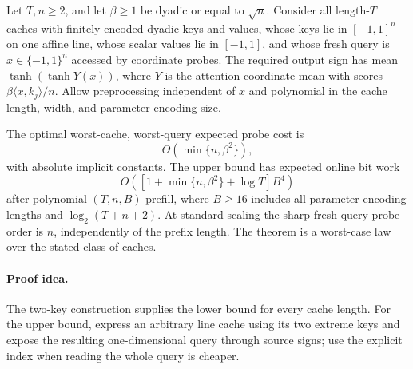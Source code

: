 \begin{theorem}
\label{thm:rankone-worstlaw}
Let $T,n\ge2$, and let $\beta\ge1$ be dyadic or equal to $\sqrt n$.
Consider all length-$T$ caches with finitely encoded dyadic keys and
values, whose keys
lie in $[-1,1]^n$ on one affine line, whose scalar values lie in
$[-1,1]$, and whose fresh query is $x\in\{-1,1\}^n$ accessed by
coordinate probes. The required output sign has mean
$\tanh(\tanh Y(x))$, where $Y$ is the attention-coordinate mean
with scores $\beta\langle x,k_j\rangle/n$.
Allow preprocessing independent of $x$ and polynomial in the cache
length, width, and parameter encoding size.

The optimal worst-cache, worst-query expected probe cost is
\[
 \Theta\!\left(\min\{n,\beta^2\}\right),
\]
with absolute implicit constants.  The upper bound has expected online bit work
\[
 O\!\left([1+\min\{n,\beta^2\}+\log T]B^4\right)
\]
after polynomial $(T,n,B)$ prefill, where $B\ge16$ includes all parameter
encoding lengths and $\log_2(T+n+2)$. At standard scaling the sharp
fresh-query probe order is $n$, independently of the prefix length.
The theorem is a worst-case law over the stated class of caches.
\end{theorem}
\paragraph{Proof idea.}
The two-key construction supplies the lower bound for every cache length.  For the upper bound, express an arbitrary line cache using its two extreme keys and expose the resulting one-dimensional query through source signs; use the explicit index when reading the whole query is cheaper.

